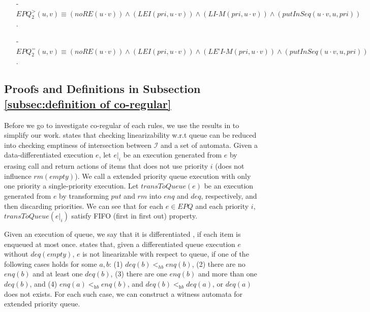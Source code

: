 \begin{itemize}
\setlength{\itemsep}{0.5pt}
\item[-] $\textit{EPQ}_2^{>}(u,v) \equiv
(\textit{noRE}(u \cdot v)) \wedge
(\textit{LEI}(\textit{pri},u \cdot v)) \wedge
(\textit{LI-M}(\textit{pri},u \cdot v)) \wedge
(\textit{putInSeq}(u \cdot v,u,\textit{pri}))$.

\item[-] $\textit{EPQ}_2^{=}(u,v) \equiv
(\textit{noRE}(u \cdot v)) \wedge
(\textit{LEI}(\textit{pri},u \cdot v)) \wedge
(\textit{LE'I-M}(\textit{pri},u \cdot v)) \wedge
(\textit{putInSeq}(u \cdot v,u,\textit{pri}))$.
\end{itemize}


\subsection{Proofs and Definitions in Subsection \ref{subsec:definition of co-regular}}
\label{sec:appendix proof and definition in section definition of co-regular}

Before we go to investigate co-regular of each rules, we use the results in \cite{Bouajjani:2015} to simplify our work. \cite{Bouajjani:2015} states that checking linearizability w.r.t queue can be reduced into checking emptiness of intersection between $\mathcal{I}$ and a set of automata. Given a data-differentiated execution $e$, let $e \vert_{i}$ be an execution generated from $e$ by erasing call and return actions of items that does not use priority $i$ (does not influence $\textit{rm}(\textit{empty})$). We call a extended priority queue execution with only one priority a single-priority execution. Let $\textit{transToQueue}(e)$ be an execution generated from $e$ by transforming $\textit{put}$ and $\textit{rm}$ into $\textit{enq}$ and $\textit{deq}$, respectively, and then discarding priorities. We can see that for each $e \in \textit{EPQ}$ and each priority $i$, $\textit{transToQueue}(e \vert_{i})$ satisfy FIFO (first in first out) property.

Given an execution of queue, we say that it is differentiated \cite{Wolper:1986}, if each item is enqueued at most once. \cite{Bouajjani:2015} states that, given a differentiated queue execution $e$ without $\textit{deq}(\textit{empty})$, $e$ is not linearizable with respect to queue, if one of the following cases holds for some $a,b$: (1) $\textit{deq}(b) <_{hb} \textit{enq}(b)$, (2) there are no $\textit{enq}(b)$ and at least one $\textit{deq}(b)$, (3) there are one $\textit{enq}(b)$ and more than one $\textit{deq}(b)$, and (4) $\textit{enq}(a) <_{\textit{hb}} \textit{enq}(b)$, and $\textit{deq}(b) <_{\textit{hb}} \textit{deq}(a)$, or $\textit{deq}(a)$ does not exists. For each such case, we can construct a witness automata for extended priority queue.

